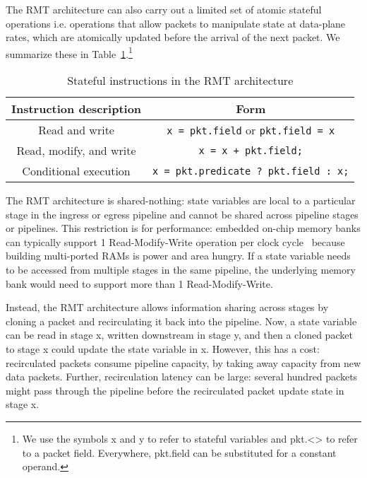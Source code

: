 The RMT architecture can also carry out a limited set of atomic stateful
operations i.e. operations that allow packets to manipulate state at data-plane
rates, which are atomically updated before the arrival of the next packet.  We
summarize these in Table~\ref{t:stateful_inst}.\footnote{We use the symbols x
and y to refer to stateful variables and pkt.<> to refer to a packet field.
Everywhere, pkt.field can be substituted for a constant operand.}
\begin{table}
\begin{tabular}{|c|c|}
Instruction description & Form \\
\hline
Read and write & \texttt{x = pkt.field} or \texttt{pkt.field = x} \\
\hline
Read, modify, and write & \texttt{x = x + pkt.field;} \\
\hline
Conditional execution & \texttt{x = pkt.predicate ? pkt.field : x;} \\
\hline
\end{tabular}
\caption{Stateful instructions in the RMT architecture}
\label{t:stateful_inst}
\end{table}

The RMT architecture is shared-nothing: state variables are local to a
particular stage in the ingress or egress pipeline and cannot be shared across
pipeline stages or pipelines. This restriction is for performance: embedded
on-chip memory banks can typically support 1 Read-Modify-Write operation per
clock cycle~\cite{some_citation_from_memoir} because building multi-ported RAMs
is power and area hungry. If a state variable needs to be accessed from
multiple stages in the same pipeline, the underlying memory bank would need to
support more than 1 Read-Modify-Write.

Instead, the RMT architecture allows information sharing across stages by
cloning a packet and recirculating it back into the pipeline. Now, a state
variable can be read in stage x, written downstream in stage y, and then a
cloned packet to stage x could update the state variable in x. However, this
has a cost: recirculated packets consume pipeline capacity, by taking away
capacity from new data packets. Further, recirculation latency can be large:
several hundred packets might pass through the pipeline before the recirculated
packet update state in stage x.

